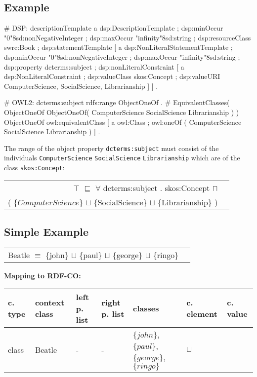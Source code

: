 \documentclass{llncs}
\newcommand{\ms}[1]{\texttt{#1}}
\newenvironment{gcotable}{
  \scriptsize
  \sffamily
  \vspace{0cm}
	\begin{center}
	\textbf{\vspace{0.4cm}Mapping to RDF-CO:} \\
  \begin{tabular}{l|l|l|l|l|l|l}
	\hline
  \textbf{c. type} & \textbf{context class} & \textbf{left p. list} & \textbf{right p. list} & \textbf{classes} & \textbf{c. element} & \textbf{c. value} \\
  \hline

}{
  \hline
  \end{tabular}
	\end{center}
}
\newenvironment{DL}{
  \vspace{0cm}
	\begin{center}
  \begin{tabular}{r l}

}{
  \end{tabular}
	\end{center}
}
\begin{document}
\subsection{Example}

\begin{ex}
# DSP:
descriptionTemplate 
    a dsp:DescriptionTemplate ;
    dsp:minOccur "0"^^xsd:nonNegativeInteger ; 
    dsp:maxOccur "infinity"^^xsd:string ; 
    dsp:resourceClass swrc:Book ; 
    dsp:statementTemplate [
        a dsp:NonLiteralStatementTemplate ;
        dsp:minOccur "0"^^xsd:nonNegativeInteger ; 
        dsp:maxOccur "infinity"^^xsd:string ; 
        dsp:property dcterms:subject ; 
        dsp:nonLiteralConstraint [ 
            a dsp:NonLiteralConstraint ;
            dsp:valueClass skos:Concept ;
            dsp:valueURI ComputerScience, SocialScience, Librarianship ] ] .
\end{ex}

\begin{ex}
# OWL2:
dcterms:subject rdfs:range ObjectOneOf . 
# EquivalentClasses( ObjectOneOf ObjectOneOf( ComputerScience SocialScience Librarianship ) )
ObjectOneOf owl:equivalentClass [ 
    a owl:Class ;
    owl:oneOf ( ComputerScience SocialScience Librarianship ) ] .
\end{ex}

The range of the object property \ms{dcterms:subject} must consist of the individuals \ms{ComputerScience} \ms{SocialScience} \ms{Librarianship} which are of the class \ms{skos:Concept}:

\begin{DL}
$\top$ $\sqsubseteq$ $\forall$ dcterms:subject . skos:Concept $\sqcap$ \\
( $\{ComputerScience\}$ $\sqcup$ \{SocialScience\} $\sqcup$ \{Librarianship\} ) \\
\end{DL}

\subsection{Simple Example}

\begin{DL}
Beatle $\equiv$ \{john\} $\sqcup$ \{paul\} $\sqcup$ \{george\} $\sqcup$ \{ringo\} \\
\end{DL}

\begin{gcotable}
class & Beatle & - & - & $\{john\}$, $\{paul\}$, $\{george\}$, $\{ringo\}$ & $\sqcup$ \\
\end{gcotable}
\end{document}
